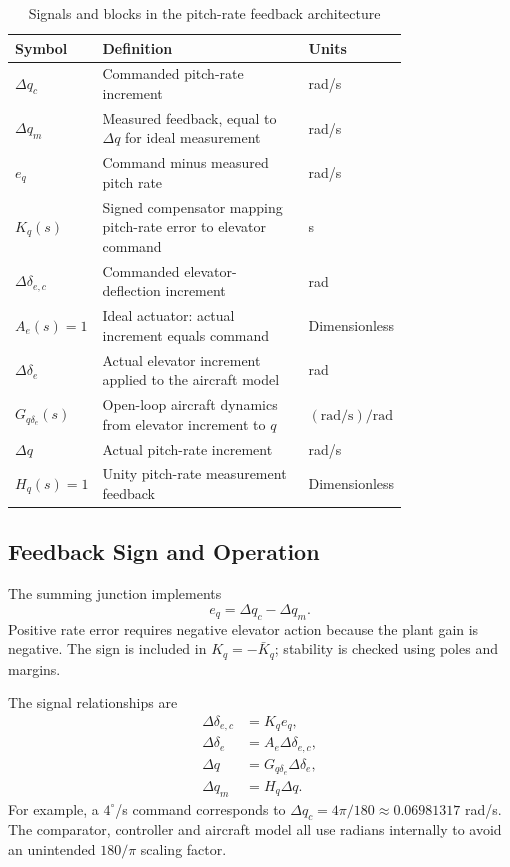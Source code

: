 \documentclass[a4paper,11pt]{article}
\newcommand{\de}{\delta_e}
\newcommand{\Gq}{G_{q\delta_e}}
\begin{document}
\begin{table}[H]\centering
\caption{Signals and blocks in the pitch-rate feedback architecture}
\begin{tabular}{p{0.22\linewidth}p{0.56\linewidth}l}\toprule
Symbol&Definition&Units\\\midrule
$\Delta q_c$&Commanded pitch-rate increment&rad/s\\
$\Delta q_m$&Measured feedback, equal to $\Delta q$ for ideal measurement&rad/s\\
$e_q$&Command minus measured pitch rate&rad/s\\
$K_q(s)$&Signed compensator mapping pitch-rate error to elevator command&s\\
$\Delta\delta_{e,c}$&Commanded elevator-deflection increment&rad\\
$A_e(s)=1$&Ideal actuator: actual increment equals command&Dimensionless\\
$\Delta\de$&Actual elevator increment applied to the aircraft model&rad\\
$\Gq(s)$&Open-loop aircraft dynamics from elevator increment to $q$&$(\mathrm{rad/s})/\mathrm{rad}$\\
$\Delta q$&Actual pitch-rate increment&rad/s\\
$H_q(s)=1$&Unity pitch-rate measurement feedback&Dimensionless\\\bottomrule
\end{tabular}
\end{table}

\subsection{Feedback Sign and Operation}
The summing junction implements
\begin{equation}\label{eq:error}
e_q=\Delta q_c-\Delta q_m.
\end{equation}
Positive rate error requires negative elevator action because the plant gain is negative. The sign is included in $K_q=-\bar K_q$; stability is checked using poles and margins.

The signal relationships are
\begin{align}
\Delta\delta_{e,c}&=K_q e_q,\\
\Delta\de&=A_e\Delta\delta_{e,c},\\
\Delta q&=\Gq\Delta\de,\\
\Delta q_m&=H_q\Delta q.
\end{align}
For example, a $4^\circ$/s command corresponds to $\Delta q_c=4\pi/180\approx0.06981317$ rad/s. The comparator, controller and aircraft model all use radians internally to avoid an unintended $180/\pi$ scaling factor.
\end{document}
